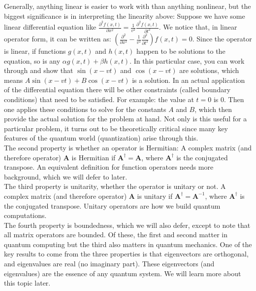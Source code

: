 \documentclass[main.tex]{subfiles}
\begin{document}
Generally, anything linear is easier to work with than anything nonlinear, but the biggest significance is in interpreting the linearity above: Suppose we have some linear differential equation like $\frac{\partial^{2} f(x, t)}{\partial x^{2}}=\frac{1}{v^{2}} \frac{\partial^{2} f(x, t)}{\partial t^{2}}$. We notice that, in linear operator form, it can be written as: $\left(\frac{\partial^{2}}{\partial x^{2}}-\frac{1}{v^{2}} \frac{\partial^{2}}{\partial t^{2}}\right) f(x, t)=0$. Since the operator is linear, if functions $g(x, t)$ and $h(x, t)$ happen to be solutions to the equation, so is any $\alpha g(x, t)+\beta h(x, t)$. In this particular case, you can work through and show that $\sin (x-v t)$ and $\cos (x-v t)$ are solutions, which means $A \sin (x-v t)+B \cos (x-v t)$ is a solution. In an actual application of the differential equation there will be other constraints (called boundary conditions) that need to be satisfied. For example: the value at $t=0$ is 0. Then one applies these conditions to solve for the constants $A$ and $B$, which then provide the actual solution for the problem at hand. Not only is this useful for a particular problem, it turns out to be theoretically critical since many key features of the quantum world (quantization) arise through this.\\ 

The second property is whether an operator is Hermitian: A complex matrix (and therefore operator) $\mathbf{A}$ is Hermitian if $\mathbf{A}^{\dagger}=\mathbf{A}$, where $\mathbf{A}^{\dagger}$ is the conjugated transpose. An equivalent definition for function operators needs more background, which we will defer to later.\\

The third property is unitarity, whether the operator is unitary or not. A complex matrix (and therefore operator) $\mathbf{A}$ is unitary if $\mathbf{A}^{\dagger}=\mathbf{A}^{-1}$, where $\mathbf{A}^{\dagger}$ is the conjugated transpose. Unitary operators are how we build quantum computations.\\

The fourth property is boundedness, which we will also defer, except to note that all matrix operators are bounded. Of these, the first and second matter in quantum computing but the third also matters in quantum mechanics. One of the key results to come from the three properties is that eigenvectors are orthogonal, and eigenvalues are real (no imaginary part). These eigenvectors (and eigenvalues) are the essence of any quantum system.
We will learn more about this topic later.
\end{document}
